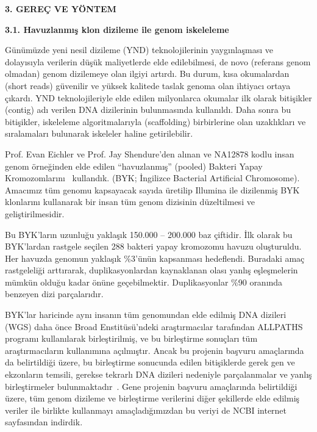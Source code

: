 \documentclass[11pt]{article}
\begin{document}
\clearpage


\begin{center}
{\bf \Large 3. GEREÇ VE YÖNTEM} 
\end{center}
\noindent

{\bf \large 3.1. Havuzlanmış klon dizileme ile genom iskeleleme}


Günümüzde yeni nesil dizileme (YND) teknolojilerinin yaygınlaşması ve dolayısıyla verilerin düşük maliyetlerde elde edilebilmesi, de novo (referans genom olmadan) 
genom dizilemeye olan ilgiyi artırdı.
Bu durum, kısa okumalardan (short reads) güvenilir ve yüksek kalitede taslak genoma olan ihtiyacı ortaya çıkardı. YND teknolojileriyle elde edilen milyonlarca okumalar ilk olarak bitişikler (contig) adı verilen DNA dizilerinin bulunmasında kullanıldı. Daha sonra bu bitişikler, iskeleleme algoritmalarıyla (scaffolding) birbirlerine olan uzaklıkları ve sıralamaları bulunarak iskeleler haline getirilebilir.

Prof. Evan Eichler ve Prof. Jay Shendure'den alınan ve NA12878 kodlu insan genom örneğinden elde edilen ``havuzlanmış'' (pooled) Bakteri Yapay Kromozomlarını~\cite{Kitzman2011} kullandık. 
(BYK; İngilizce Bacterial Artificial Chromosome). 
Amacımız tüm genomu kapsayacak sayıda üretilip Illumina ile dizilenmiş BYK klonlarını kullanarak bir insan tüm genom dizisinin düzeltilmesi ve geliştirilmesidir.
	
Bu BYK’ların uzunluğu yaklaşık 150.000 – 200.000 baz çiftidir. İlk olarak bu BYK'lardan rastgele seçilen 288 bakteri yapay kromozomu havuzu oluşturuldu. Her havuzda genomun yaklaşık \%3'ünün 
kapsanması hedeflendi. Buradaki amaç rastgeleliği arttırarak, duplikasyonlardan kaynaklanan olası yanlış eşleşmelerin mümkün olduğu kadar önüne geçebilmektir. 
Duplikasyonlar \%90 oranında benzeyen dizi parçalarıdır. 

BYK’lar haricinde aynı insanın tüm genomundan elde edilmiş DNA dizileri (WGS) daha önce Broad Enstitüsü’ndeki araştırmacılar tarafından ALLPATHS~\cite{Gnerre2011} programı kullanılarak birleştirilmiş, ve bu birleştirme sonuçları tüm araştırmacıların kullanımına açılmıştır. Ancak bu projenin başvuru amaçlarında da belirtildiği üzere, bu birleştirme sonucunda edilen bitişiklerde gerek gen ve ekzonların temsili, gerekse tekrarlı DNA dizileri nedeniyle parçalanmalar ve yanlış birleştirmeler bulunmaktadır~\cite{Alkan2011c}. Gene projenin başvuru amaçlarında belirtildiği üzere, tüm genom dizileme ve birleştirme verilerini diğer şekillerde elde edilmiş veriler ile birlikte kullanmayı amaçladığımızdan bu veriyi de NCBI internet sayfasından indirdik.
\end{document}
